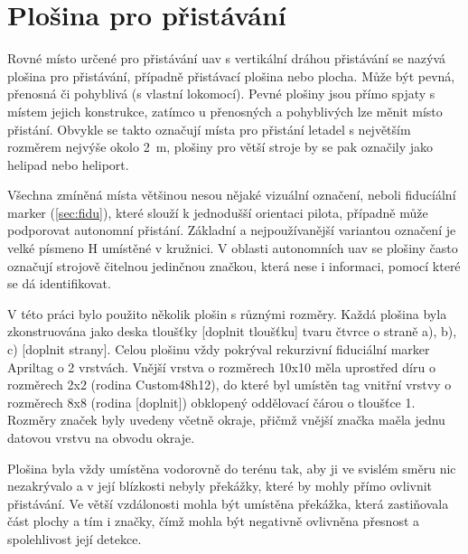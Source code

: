 \chapter{Plošina pro přistávání}
  Rovné místo určené pro přistávání \acrshort{uav} s vertikální dráhou přistávání se nazývá plošina pro přistávání, případně přistávací plošina nebo plocha. Může být pevná, přenosná či pohyblivá (s vlastní lokomocí). Pevné plošiny jsou přímo spjaty s místem jejich konstrukce, zatímco u přenosných a pohyblivých lze měnit místo přistání. Obvykle se takto označují místa pro přistání letadel s největším rozměrem nejvýše okolo 2~m, plošiny pro větší stroje by se pak označily jako helipad nebo heliport.

  Všechna zmíněná místa většinou nesou nějaké vizuální označení, neboli fiducíální marker (\cref{sec:fidu}), které slouží k jednodušší orientaci pilota, případně může podporovat autonomní přistání. Základní a nejpoužívanější variantou označení je velké písmeno H umístěné v kružnici. V oblasti autonomních \acrshort{uav} se plošiny často označují strojově čitelnou jedinčnou značkou, která nese i informaci, pomocí které se dá identifikovat.

  V této práci bylo použito několik plošin s různými rozměry. Každá plošina byla zkonstruována jako deska tloušťky [doplnit tloušťku] tvaru čtvrce o straně a), b), c) [doplnit strany]. Celou plošinu vždy pokrýval rekurzivní fiduciální marker Apriltag o 2 vrstvách. Vnější vrstva o rozměrech 10x10 měla uprostřed díru o rozměrech 2x2 (rodina Custom48h12), do které byl umístěn tag vnitřní vrstvy o rozměrech 8x8 (rodina [doplnit]) obklopený oddělovací čárou o tloušťce 1. Rozměry značek byly uvedeny včetně okraje, přičmž vnější značka maěla jednu datovou vrstvu na obvodu okraje.
  
  Plošina byla vždy umístěna vodorovně do terénu tak, aby ji ve svislém směru nic nezakrývalo a v její blízkosti nebyly překážky, které by mohly přímo ovlivnit přistávání. Ve větší vzdálonosti mohla být umístěna překážka, která zastiňovala část plochy a tím i značky, čímž mohla být negativně ovlivněna přesnost a spolehlivost její detekce.
